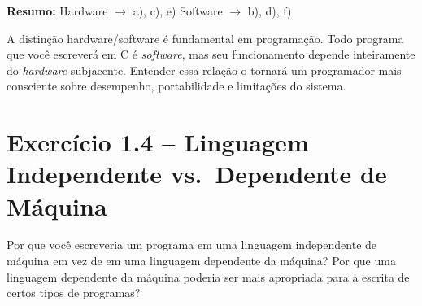 \documentclass[12pt,a4paper]{article}
\begin{document}
\begin{respostabox}
\medskip
\textbf{Resumo:} Hardware $\rightarrow$ a), c), e) \qquad Software $\rightarrow$ b), d), f)

\end{respostabox}

\begin{boaprática}
  A distinção hardware/software é fundamental em programação. Todo programa que
  você escreverá em C é \textit{software}, mas seu funcionamento depende inteiramente
  do \textit{hardware} subjacente. Entender essa relação o tornará um programador
  mais consciente sobre desempenho, portabilidade e limitações do sistema.
\end{boaprática}

\newpage

\section{Exercício 1.4 -- Linguagem Independente vs.\ Dependente de Máquina}

\begin{enunciadoBox}[Enunciado]
Por que você escreveria um programa em uma linguagem independente de máquina em vez
de em uma linguagem dependente da máquina? Por que uma linguagem dependente da máquina
poderia ser mais apropriada para a escrita de certos tipos de programas?
\end{enunciadoBox}

\bigskip
\end{document}
